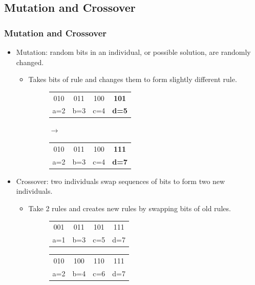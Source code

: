 \documentclass{beamer}
\newcommand{\linespace}{\vskip 0.25cm}
\begin{document}
\subsection{Mutation and Crossover}
\begin{frame}
  \frametitle{Mutation and Crossover}
	\begin{itemize}
        \item Mutation: random bits in an individual, or possible solution, are randomly changed.
        \begin{itemize}
        	\item Takes bits of rule and changes them to form slightly different rule.
        	
        	\begin{figure}
			\begin{tabular}{|cccc|} \hline
			010 & 011 & 100 & \textbf{101}\\
			a=2 & b=3 & c=4 & \textbf{d=5}\\
			\hline\end{tabular}
			$\rightarrow$
			\quad
			\begin{tabular}{|cccc|} \hline
			010 & 011 & 100 & \textbf{111}\\
			a=2 & b=3 & c=4 & \textbf{d=7}\\
			\hline\end{tabular}			
			\end{figure}
        \end{itemize}
        
        \linespace
        \linespace
        \linespace
        
        \item Crossover: two individuals swap sequences of bits to form two new individuals.
        \begin{itemize}
        	\item Take 2 rules and creates new rules by swapping bits of old rules.
        	
        	\begin{figure}
			\begin{tabular}{|cccc|} \hline
			001 & 011 & 101 & 111\\
			a=1 & b=3 & c=5 & d=7\\
			\hline\end{tabular}
			\quad
			\begin{tabular}{|cccc|} \hline
			010 & 100 & 110 & 111\\
			a=2 & b=4 & c=6 & d=7\\
			\hline\end{tabular}			
			\end{figure}
        \end{itemize}
	\end{itemize}
\end{frame}
\end{document}
